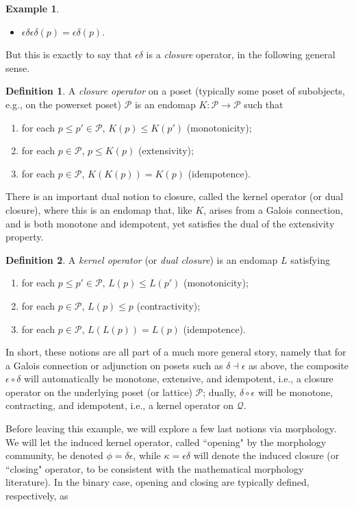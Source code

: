 \documentclass[11pt]{book}
\theoremstyle{definition}
\newtheorem{example}{Example}[section]
\theoremstyle{definition}
\newtheorem{definition}{Definition}[section]
\theoremstyle{definition}
\theoremstyle{theorem}
\theoremstyle{definition}
\begin{document}
\begin{example}
\begin{itemize}
	\item $\epsilon \delta \epsilon \delta (p) = \epsilon \delta (p)$. 
\end{itemize}
But this is exactly to say that $\epsilon \delta$ is a \textit{closure} operator, in the following general sense. 
\begin{definition} 
	A \textit{closure operator} on a poset (typically some poset of subobjects, e.g., on the powerset poset) $\mathcal{P}$ is an endomap $K: \mathcal{P} \rightarrow \mathcal{P}$ such that
	\begin{enumerate}
		\item for each $p \leq p' \in \mathcal{P}$, $K(p) \leq K(p')$ (monotonicity);  
		\item for each $p \in \mathcal{P}$, $p \leq K(p)$ (extensivity); 
		\item for each $p \in \mathcal{P}$, $K(K(p)) = K(p)$ (idempotence).
	\end{enumerate}
\end{definition} \noindent 
There is an important dual notion to closure, called the kernel operator (or dual closure), where this is an endomap that, like $K$, arises from a Galois connection, and is both monotone and idempotent, yet satisfies the dual of the extensivity property.  
\begin{definition}
	A \textit{kernel operator} (or \textit{dual closure}) is an endomap $L$ satisfying 
	\begin{enumerate}
		\item for each $p \leq p' \in \mathcal{P}$, $L(p) \leq L(p')$ (monotonicity);  
		\item for each $p \in \mathcal{P}$, $L(p) \leq p$ (contractivity);
		\item for each $p \in \mathcal{P}$, $L(L(p)) = L(p)$ (idempotence). 
	\end{enumerate}
\end{definition}
In short, these notions are all part of a much more general story, namely that for a Galois connection or adjunction on posets such as $\delta \dashv \epsilon$ as above, the composite $\epsilon \circ \delta$ will automatically be monotone, extensive, and idempotent, i.e., a closure operator on the underlying poset (or lattice) $\mathcal{P}$; dually, $\delta \circ \epsilon$ will be monotone, contracting, and idempotent, i.e., a kernel operator on $\mathcal{Q}$. \par 	
Before leaving this example, we will explore a few last notions via morphology. We will let the induced kernel operator, called ``opening" by the morphology community, be denoted $\phi = \delta \epsilon$, while $\kappa = \epsilon \delta$ will denote the induced closure (or ``closing" operator, to be consistent with the mathematical morphology literature). In the binary case, opening and closing are typically defined, respectively, as 

\end{example}
\end{document}
